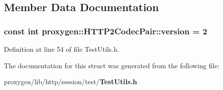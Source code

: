 \subsection{Member Data Documentation}
\subsubsection[{version}]{\setlength{\rightskip}{0pt plus 5cm}const int proxygen\+::\+H\+T\+T\+P2\+Codec\+Pair\+::version = 2\hspace{0.3cm}{\ttfamily [static]}}\label{structproxygen_1_1HTTP2CodecPair_a3bc4026aaf1c7395d104d9bb76845ba3}


Definition at line 54 of file Test\+Utils.\+h.



The documentation for this struct was generated from the following file\+:\begin{DoxyCompactItemize}
\item 
proxygen/lib/http/session/test/{\bf Test\+Utils.\+h}\end{DoxyCompactItemize}

